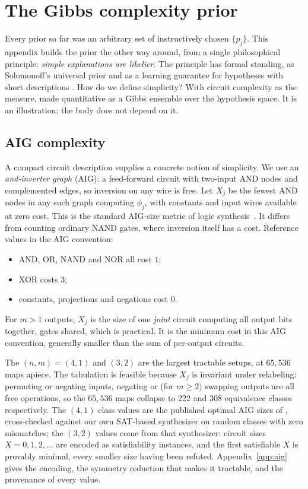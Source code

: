 \documentclass[11pt]{article}
\let\stdsection\section
\renewcommand{\section}{\clearpage\stdsection}
\begin{document}
\section{The Gibbs complexity prior}\label{app:gibbs}

Every prior so far was an arbitrary set of instructively chosen $\{p_j\}$. 
This appendix builds the prior the other way around, from a
single philosophical principle: \emph{simple explanations are likelier}.
The principle has formal standing, as Solomonoff's universal prior
\cite{solomonoff64,livitanyi08} and as a learning guarantee for hypotheses
with short descriptions \cite{blumer87}. 
How do we define simplicity? With circuit
complexity as the measure, made quantitative as a Gibbs
ensemble over the hypothesis space. It is an illustration; the body
does not depend on it.

\subsection{AIG complexity}
\label{sec:aigcomplexity}

A compact circuit description supplies a concrete notion of
simplicity. We use an \emph{and-inverter graph} (AIG): a feed-forward
circuit with two-input AND nodes and complemented edges, so inversion
on any wire is free. Let $X_j$ be the fewest AND nodes in any such
graph computing $\phi_j$, with constants and input wires available
at zero cost. This is the standard AIG-size metric of logic
synthesis~\cite{aigrewrite}. It differs from counting ordinary
NAND gates, where inversion itself has a cost. Reference values in
the AIG convention:
\begin{itemize}
  \item AND, OR, NAND and NOR all cost $1$;
  \item XOR costs $3$;
  \item constants, projections and negations cost $0$.
\end{itemize}   
For $m > 1$ outputs, $X_j$ is the size of one \emph{joint} circuit computing all
output bits together, gates shared, which is practical. It is the minimum
cost in this AIG convention, generally smaller than the sum of per-output circuits.

The $(n,m) = (4,1)$ and $(3,2)$ are the largest tractable setups, at $65{,}536$ maps apiece. 
The tabulation is feasible because $X_j$ is invariant under
relabeling: permuting or negating inputs, negating or (for $m \ge 2$)
swapping outputs are all free operations, so the $65{,}536$ maps collapse to $222$ and $308$
equivalence classes respectively. The $(4,1)$ class values are the published
optimal AIG sizes of \cite{krinkin}, cross-checked against our own
SAT-based synthesizer on random classes with zero mismatches; the $(3,2)$
values come from that synthesizer: circuit sizes $X = 0, 1, 2,
\ldots$ are encoded as satisfiability instances, and the first
satisfiable $X$ is provably minimal, every smaller size having been
refuted. Appendix~\ref{app:aig} gives the encoding, the symmetry
reduction that makes it tractable, and the provenance of every value.
\end{document}
